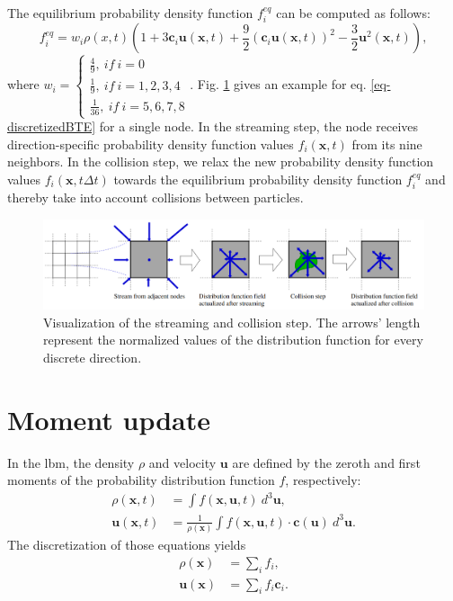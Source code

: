 \documentclass[a4paper,11pt, footsepline]{book}
\begin{document}
The equilibrium probability density function $f_{i}^{eq}$ can be computed as follows:
\begin{equation}
\label{eq-equilibrium}
f_{i}^{eq}=w_{i}\rho(x,t)(1+3\mathbf{c}_{i}\mathbf{u}(\mathbf{x},t)+\frac{9}{2}(\mathbf{c}_{i}\mathbf{u}(\mathbf{x},t))^{2}-\frac{3}{2}\mathbf{u}^{2}(\mathbf{x},t)),
\end{equation}
where $w_{i}=
\begin{cases}
\frac{4}{9}, ~if~i=0\\
\frac{1}{9}, ~if~i=1,2,3,4\\
\frac{1}{36}, ~if~i=5,6,7,8
\end{cases}$. Fig. \ref{fig:streamingCollisionVis} gives an example for eq. \ref{eq-discretizedBTE} for a single node. In the streaming step, the node receives direction-specific probability density function values $f_{i}(\mathbf{x},t)$ from its nine neighbors. In the collision step, we relax the new probability density function values $f_{i}(\mathbf{x},t\Delta t)$ towards the equilibrium probability density function $f^{eq}_{i}$ and thereby take into account collisions between particles.
\begin{figure}
  \begin{center}
   \includegraphics[width=\textwidth]{../figures/lbm/vis.png}
   \caption{Visualization of the streaming and collision step. The arrows' length represent the normalized values of the distribution function for every discrete direction.}
  \label{fig:streamingCollisionVis}
  \end{center}
\end{figure}
\section{Moment update}\label{sec-momentUpdate}
In the \ac{lbm}, the density $\rho$ and velocity $\mathbf{u}$ are defined by the zeroth and first moments of the probability distribution function $f$, respectively:
\begin{align} 
\rho(\mathbf{x},t) &=  \int f(\mathbf{x}, \mathbf{u},t)~d^{3}\mathbf{u}, \\ 
\mathbf{u}(\mathbf{x},t) &=  \frac{1}{\rho(\mathbf{x})}\int f(\mathbf{x}, \mathbf{u},t)\cdot\mathbf{c}(\mathbf{u})~d^{3}\mathbf{u}.
\end{align}
The discretization of those equations yields
\begin{align}
\label{eq-density}
\rho(\mathbf{x}) &=  \sum\limits_{i} f_{i}, \\ 
\label{eq-velocity}
\mathbf{u}(\mathbf{x}) &=  \sum\limits_{i} f_{i}\mathbf{c}_{i}.
\end{align}
\end{document}
